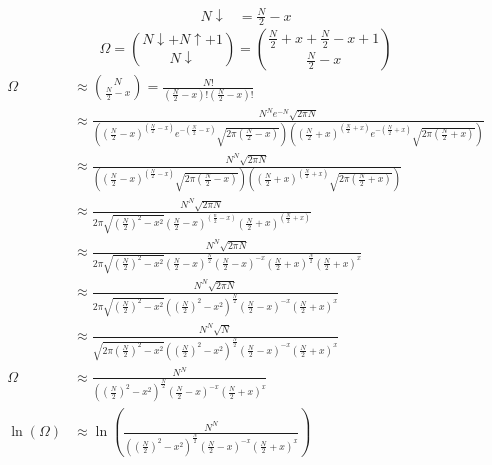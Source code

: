 \documentclass{article}
\begin{document}
\begin{enumerate}
\begin{enumerate}
\begin{align*}
                N \downarrow &= \frac{N}{2} - x
            \end{align*}
            \begin{equation*}
                \Omega = \binom{N \downarrow + N \uparrow + 1}{N \downarrow} = \binom{\frac{N}{2} + x + \frac{N}{2} - x + 1}{\frac{N}{2} - x}
            \end{equation*}
            \begin{align*}
                \Omega &\approx \binom{N}{\frac{N}{2} - x} = \frac{N!}{\left( \frac{N}{2} - x \right)!\left( \frac{N}{2} - x \right)!} \\
                &\approx \frac{N^N e^{-N} \sqrt{2 \pi N}}{\left( \left( \frac{N}{2} - x \right)^{(\frac{N}{2} - x)} e^{-(\frac{N}{2} - x)} \sqrt{2 \pi (\frac{N}{2} - x)} \right) \left( \left( \frac{N}{2} + x \right)^{(\frac{N}{2} + x)} e^{-(\frac{N}{2} + x)} \sqrt{2 \pi (\frac{N}{2} + x)} \right)} \\
                &\approx \frac{N^N \sqrt{2 \pi N}}{\left( \left( \frac{N}{2} - x \right)^{(\frac{N}{2} - x)} \sqrt{2 \pi (\frac{N}{2} - x)} \right) \left( \left( \frac{N}{2} + x \right)^{(\frac{N}{2} + x)} \sqrt{2 \pi (\frac{N}{2} + x)} \right)} \\
                &\approx \frac{N^N \sqrt{2 \pi N}}{2 \pi \sqrt{(\frac{N}{2})^2 - x^2} \left( \frac{N}{2} - x \right)^{(\frac{n}{2} - x)} \left( \frac{N}{2} + x \right)^{(\frac{N}{2} + x)}} \\
                &\approx \frac{N^N \sqrt{2 \pi N}}{2 \pi \sqrt{(\frac{N}{2})^2 - x^2} \left( \frac{N}{2} - x \right)^{\frac{N}{2}} \left( \frac{N}{2} - x \right)^{-x} \left( \frac{N}{2} + x \right)^{\frac{N}{2}} \left( \frac{N}{2} + x \right)^{x}} \\
                &\approx \frac{N^N \sqrt{2 \pi N}}{2 \pi \sqrt{(\frac{N}{2})^2 - x^2} \left( \left( \frac{N}{2} \right)^2 - x^2 \right)^{\frac{N}{2}} \left( \frac{N}{2} - x \right)^{-x} \left( \frac{N}{2} + x \right)^{x}} \\
                &\approx \frac{N^N \sqrt{N}}{\sqrt{2 \pi (\frac{N}{2})^2 - x^2} \left( \left( \frac{N}{2} \right)^2 - x^2 \right)^{\frac{N}{2}} \left( \frac{N}{2} - x \right)^{-x} \left( \frac{N}{2} + x \right)^{x}} \\
                \Omega &\approx \frac{N^N}{\left( \left( \frac{N}{2} \right)^2 - x^2 \right)^{\frac{N}{2}} \left( \frac{N}{2} - x \right)^{-x} \left( \frac{N}{2} + x \right)^{x}} \\
                \ln(\Omega) &\approx \ln\left( \frac{N^N}{\left( \left( \frac{N}{2} \right)^2 - x^2 \right)^{\frac{N}{2}} \left( \frac{N}{2} - x \right)^{-x} \left( \frac{N}{2} + x \right)^{x}} \right) \\

\end{align*}
\end{enumerate}
\end{enumerate}
\end{document}
